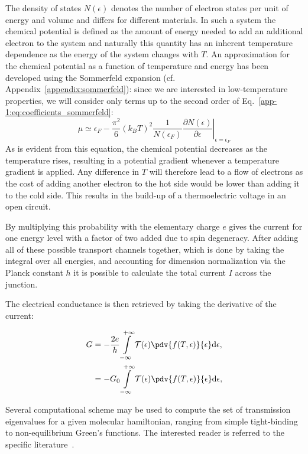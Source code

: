 The density of states $N(\epsilon)$ denotes the number of electron states per unit of energy and volume and differs for different materials.
In such a system the chemical potential is defined as the amount of energy needed
to add an additional electron to the system and naturally this quantity has an
inherent temperature dependence as the energy of the system changes with $T$. An
approximation for the chemical potential as a function of temperature and energy
has been developed using the Sommerfeld expansion (cf. Appendix~\ref{appendix:sommerfeld}): since we are interested in low-temperature properties, we will consider only terms up to the second order of Eq.~\ref{app-1:eq:coefficients_sommerfeld}:
\begin{equation}
    \mu \simeq \epsilon_{F}-\left.\frac{\pi^{2}}{6}\left(k_{B} T\right)^{2} \frac{1}{N\left(\epsilon_{F}\right)} \frac{\partial N(\epsilon)}{\partial \epsilon}\right|_{\epsilon=\epsilon_{F}}
\end{equation}
As is evident from this equation, the chemical potential decreases as the temperature
rises, resulting in a potential gradient whenever a temperature gradient is applied.
Any difference in $T$ will therefore lead to a flow of electrons as the cost of adding
another electron to the hot side would be lower than adding it to the cold side. This
results in the build-up of a thermoelectric voltage in an open circuit.

By multiplying this probability with the elementary charge $e$ gives the current for one energy level with a factor of two added due to spin degeneracy. After adding all of these possible transport channels together, which is done by taking the integral over all energies, and accounting for
dimension normalization via the Planck constant $h$ it is possible to calculate the total current $I$ across the junction.

The electrical conductance is then retrieved by taking the derivative of the current:

\begin{align}
    G & = -\frac{2e}{h} \int\limits_{-\infty}^{+\infty}\mathcal{T}(\epsilon)\pdv{f(T, \epsilon)}{\epsilon}\text{d}\epsilon,\nonumber \\
      & = - G_0 \int\limits_{-\infty}^{+\infty}\mathcal{T}(\epsilon)\pdv{f(T, \epsilon)}{\epsilon}\text{d}\epsilon,
\end{align}

Several computational scheme may be used to compute the set of transmission eigenvalues for a given molecular hamiltonian, ranging from simple tight-binding to non-equilibrium Green's functions. The interested reader is referred to the specific literature~\cite{cuevas2010molecular}.